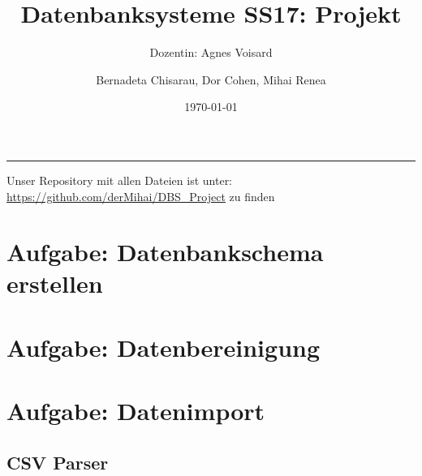 \documentclass[paper=a4, english, ngerman, romanian]{scrartcl}
\begin{document}
\begin{titlepage}
	\title{Datenbanksysteme SS17: Projekt}	
	\subtitle{Dozentin: Agnes Voisard}
	\author{Bernadeta Chisarau, Dor Cohen, Mihai Renea}
	\date{\normalsize \today}
\end{titlepage}

\maketitle								%
\vspace*{-8cm}							%

\vspace{7cm}							%
\rule{\linewidth}{0.8pt}				%
	
Unser Repository mit allen Dateien ist unter: \url{https://github.com/derMihai/DBS_Project} zu finden 
	
	\section{Aufgabe: Datenbankschema erstellen}
	 
	
	\section{Aufgabe: Datenbereinigung}
	 

	\section{Aufgabe: Datenimport}
	 	
	
	\subsection{CSV Parser}
	
	 	
\end{document}
